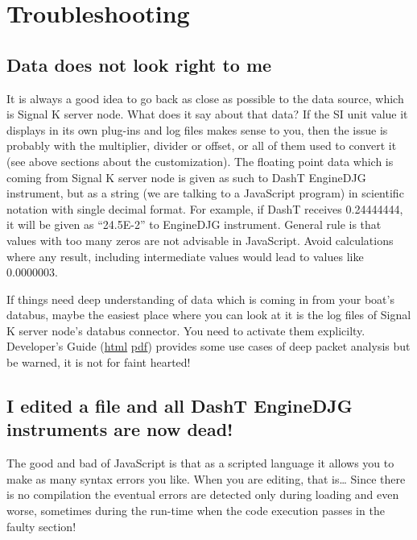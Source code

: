 \documentclass[11pt]{article}
\begin{document}
    \hypertarget{troubleshooting}{%
\section{Troubleshooting}\label{troubleshooting}}

    \hypertarget{data-does-not-look-right-to-me}{%
\subsection{Data does not look right to
me}\label{data-does-not-look-right-to-me}}

    It is always a good idea to go back as close as possible to the data
source, which is Signal K server node. What does it say about that data?
If the SI unit value it displays in its own plug-ins and log files makes
sense to you, then the issue is probably with the multiplier, divider or
offset, or all of them used to convert it (see above sections about the
customization). The floating point data which is coming from Signal K
server node is given as such to DashT EngineDJG instrument, but as a
string (we are talking to a JavaScript program) in scientific notation
with single decimal format. For example, if DashT receives 0.24444444,
it will be given as ``24.5E-2'' to EngineDJG instrument. General rule is
that values with too many zeros are not advisable in JavaScript. Avoid
calculations where any result, including intermediate values would lead
to values like 0.0000003.

    If things need deep understanding of data which is coming in from your
boat's databus, maybe the easiest place where you can look at it is the
log files of Signal K server node's databus connector. You need to
activate them explicilty. Developer's Guide
(\href{./developers/README.html}{html} \textbar{}
\href{./developers/README.pdf}{pdf}) provides some use cases of deep
packet analysis but be warned, it is not for faint hearted!

    \hypertarget{i-edited-a-file-and-all-dasht-enginedjg-instruments-are-now-dead}{%
\subsection{I edited a file and all DashT EngineDJG instruments are now
dead!}\label{i-edited-a-file-and-all-dasht-enginedjg-instruments-are-now-dead}}

    The good and bad of JavaScript is that as a scripted language it allows
you to make as many syntax errors you like. When you are editing, that
is\ldots{} Since there is no compilation the eventual errors are
detected only during loading and even worse, sometimes during the
run-time when the code execution passes in the faulty section!
\end{document}
